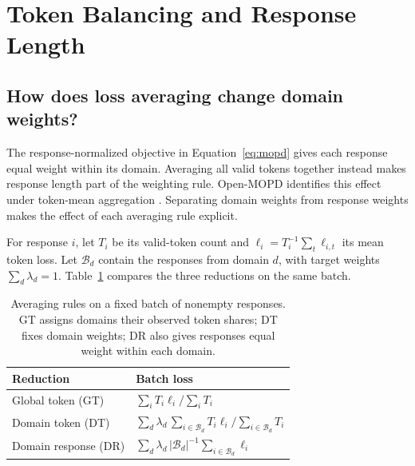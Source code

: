 \section{Token Balancing and Response Length}
\label{sec:normalization}

\subsection{How does loss averaging change domain weights?}

The response-normalized objective in Equation~\ref{eq:mopd} gives each response equal weight within its domain. Averaging all valid tokens together instead makes response length part of the weighting rule. Open-MOPD identifies this effect under token-mean aggregation \citep[Section~3.3]{gao2026openmopddiagnosingfixingcapability}. Separating domain weights from response weights makes the effect of each averaging rule explicit.

For response $i$, let $T_i$ be its valid-token count and $\ell_i=T_i^{-1}\sum_t\ell_{i,t}$ its mean token loss. Let $\mathcal B_d$ contain the responses from domain $d$, with target weights $\sum_d\lambda_d=1$. Table~\ref{tab:normalization} compares the three reductions on the same batch.

\begin{table}[t]
\caption{Averaging rules on a fixed batch of nonempty responses. GT assigns domains their observed token shares; DT fixes domain weights; DR also gives responses equal weight within each domain.}
\label{tab:normalization}
\centering\small
\renewcommand{\arraystretch}{1.2}
\begin{tabular*}{\linewidth}{@{\extracolsep{\fill}}ll@{}}
\toprule
Reduction & Batch loss \\
\midrule
Global token (GT) & $\sum_i T_i\ell_i/\sum_i T_i$ \\
Domain token (DT) & $\sum_d\lambda_d\,\sum_{i\in\mathcal B_d}T_i\ell_i/\sum_{i\in\mathcal B_d}T_i$ \\
Domain response (DR) & $\sum_d\lambda_d\,|\mathcal B_d|^{-1}\sum_{i\in\mathcal B_d}\ell_i$ \\
\bottomrule
\end{tabular*}
\end{table}

